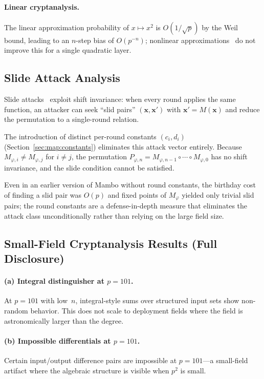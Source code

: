\documentclass[11pt,a4paper]{article}
\theoremstyle{definition}
\begin{document}
\paragraph{Linear cryptanalysis.}
The linear approximation probability of $x \mapsto x^2$ is
$O(1/\!\sqrt{p})$ by the Weil bound, leading to an $n$-step bias of
$O(p^{-n})$; nonlinear approximations~\cite{Knudsen_Robshaw_1996} do
not improve this for a single quadratic layer.


\subsection{Slide Attack Analysis}\label{sec:security:slide}

Slide attacks~\cite{Biryukov_Wagner} exploit shift invariance: when every
round applies the same function, an attacker can seek ``slid pairs''
$(\mathbf{x}, \mathbf{x}')$ with $\mathbf{x}' = M(\mathbf{x})$ and reduce
the permutation to a single-round relation.

The introduction of distinct per-round constants $(c_i, d_i)$
(Section~\ref{sec:map:constants}) eliminates this attack vector entirely.
Because $M_{\varphi,i} \ne M_{\varphi,j}$ for $i \ne j$, the permutation
$P_{\varphi,n} = M_{\varphi,n-1} \circ \cdots \circ M_{\varphi,0}$
has no shift invariance, and the slide condition cannot be satisfied.

Even in an earlier version of Mambo without round constants, the
birthday cost of finding a slid pair was $O(p)$ and fixed points of
$M_\varphi$ yielded only trivial slid pairs; the round constants are
a defense-in-depth measure that eliminates the attack class
unconditionally rather than relying on the large field size.


\subsection{Small-Field Cryptanalysis Results (Full Disclosure)}\label{sec:security:smallfield}

\paragraph{(a) Integral distinguisher at $p=101$.}
At $p=101$ with low~$n$, integral-style sums over structured input sets show
non-random behavior. This does not scale to deployment fields where the
field is astronomically larger than the degree.

\paragraph{(b) Impossible differentials at $p=101$.}
Certain input/output difference pairs are impossible at $p=101$---a
small-field artifact where the algebraic structure is visible when $p^2$ is
small.
\end{document}
